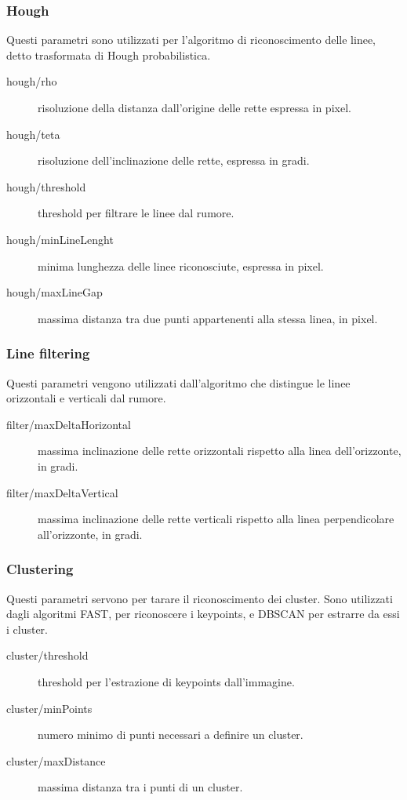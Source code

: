\subsubsection{Hough}

Questi parametri sono utilizzati per l'algoritmo di riconoscimento delle linee, detto trasformata di Hough probabilistica.

\begin{description}
 \item [hough/rho] risoluzione della distanza dall'origine delle rette espressa in pixel.
 \item [hough/teta] risoluzione dell'inclinazione delle rette, espressa in gradi.
 \item [hough/threshold] threshold per filtrare le linee dal rumore.
 \item [hough/minLineLenght] minima lunghezza delle linee riconosciute, espressa in pixel.
 \item [hough/maxLineGap] massima distanza tra due punti appartenenti alla stessa linea, in pixel.
\end{description}

\subsubsection{Line filtering}

Questi parametri vengono utilizzati dall'algoritmo che distingue le linee orizzontali e verticali dal rumore.

\begin{description}
 \item [filter/maxDeltaHorizontal] massima inclinazione delle rette orizzontali rispetto alla linea dell'orizzonte, in gradi.
 \item [filter/maxDeltaVertical] massima inclinazione delle rette verticali rispetto alla linea perpendicolare all'orizzonte, in gradi.
\end{description}


\subsubsection{Clustering}

Questi parametri servono per tarare il riconoscimento dei cluster. Sono utilizzati dagli algoritmi FAST, per riconoscere i keypoints, e DBSCAN per estrarre da essi i cluster.

\begin{description}
 \item [cluster/threshold] threshold per l'estrazione di keypoints dall'immagine.
 \item [cluster/minPoints] numero minimo di punti necessari a definire un cluster.
 \item [cluster/maxDistance] massima distanza tra i punti di un cluster.
\end{description}

